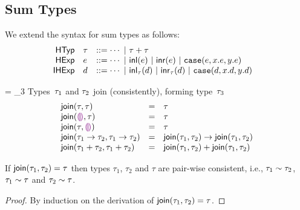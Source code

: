 
\subsection{Sum Types}


We extend the syntax for sum types as follows:
\[
\begin{array}{rllllll}
\mathsf{HTyp} & \tau & ::= \cdots ~\vert~ {\tau + \tau} &
\\
\mathsf{HExp} & e & ::= \cdots
~\vert~ \mathsf{inl}(e)
~\vert~ \mathsf{inr}(e)
~\vert~ \texttt{case}({e},{x}.{e},{y}.{e})
\\
\mathsf{IHExp} & d & ::= \cdots
~\vert~ \mathsf{inl}_{\tau}(d)
~\vert~ \mathsf{inr}_{\tau}(d)
~\vert~ \texttt{case}({d},{x}.{d},{y}.{d})
\end{array}
\]



\judgbox
 { = \htau_3}
 {Types~$\tau_1$ and $\tau_2$ join (consistently), forming type~$\tau_3$}
\[
\begin{array}{lcl}
\textsf{join}(\tau,\tau) &=&  \tau
\\
\textsf{join}(\textcolor{violet}{\llparenthesis}\textcolor{violet}{\rrparenthesis},\tau) &=&  \tau
\\
\textsf{join}(\tau,\textcolor{violet}{\llparenthesis}\textcolor{violet}{\rrparenthesis}) &=&  \tau
\\
\textsf{join}(\tau_1 \rightarrow \tau_2,\tau_1 \rightarrow \tau_2)
&=&
\textsf{join}(\tau_1,\tau_2) \rightarrow \textsf{join}(\tau_1,\tau_2)
\\
\textsf{join}({\tau_1} + {\tau_2},{\tau_1} + {\tau_2})
&=&
{\textsf{join}(\tau_1,\tau_2)} + {\textsf{join}(\tau_1,\tau_2)}
\end{array}
\]

\begin{thm}[Joins]
If $\textsf{join}(\tau_1,\tau_2) = \tau$ 
%
then types $\tau_1$, $\tau_2$ and $\tau$ are pair-wise consistent, i.e.,
%
$\tau_1 \sim \tau_2$, 
$\tau_1 \sim \tau$ and 
$\tau_2 \sim \tau$.
\begin{proof}
By induction on the derivation of $\textsf{join}(\tau_1,\tau_2) = \tau$.
\end{proof}
\end{thm}

